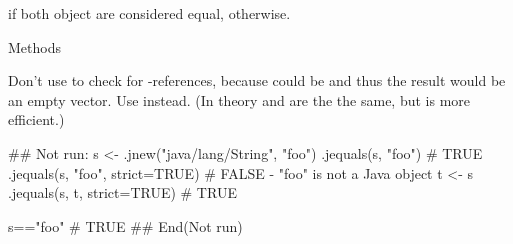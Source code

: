\begin{Value}
 if both object are considered equal,  otherwise.
\end{Value}
\begin{Section}{Methods}
\end{Section}
\begin{Note}\relax
Don't use  to check for
-references, because  could be  and thus
the result would be an empty vector. Use 
instead.
(In theory  and  are the the same,
but  is more efficient.)
\end{Note}
\begin{SeeAlso}\relax
{}
\end{SeeAlso}
\begin{Examples}
\begin{ExampleCode}
## Not run: 
s <- .jnew("java/lang/String", "foo")
.jequals(s, "foo") # TRUE
.jequals(s, "foo", strict=TRUE) # FALSE - "foo" is not a Java object
t <- s
.jequals(s, t, strict=TRUE) # TRUE

s=="foo" # TRUE
## End(Not run)
\end{ExampleCode}
\end{Examples}

